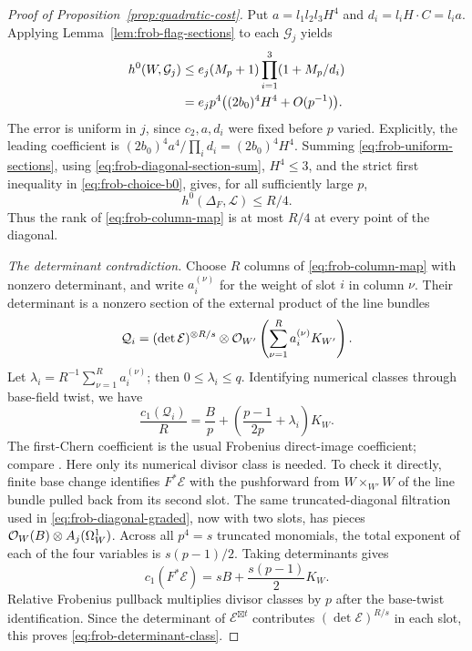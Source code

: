 \begin{proof}[Proof of Proposition~\ref{prop:quadratic-cost}]
Put $a=l_1l_2l_3H^4$ and $d_i=l_iH\cdot C=l_i a$.  Applying
Lemma~\ref{lem:frob-flag-sections} to each $\mathcal G_j$ yields
\begin{align}
 h^0(W,\mathcal G_j)
 &\le e_j(M_p+1)\prod_{i=1}^3(1+M_p/d_i)\notag\\
 &=e_jp^4\bigl((2b_0)^4H^4+O(p^{-1})\bigr).
 \label{eq:frob-uniform-sections}
\end{align}
The error is uniform in $j$, since $c_2,a,d_i$ were fixed before $p$
varied.  Explicitly, the leading coefficient is
$(2b_0)^4a^4/\prod_i d_i=(2b_0)^4H^4$.
Summing \eqref{eq:frob-uniform-sections}, using
\eqref{eq:frob-diagonal-section-sum}, $H^4\le3$, and the strict first
inequality in \eqref{eq:frob-choice-b0}, gives, for all sufficiently
large $p$,
\begin{equation}\label{eq:frob-diagonal-rank}
 h^0(\Delta_F,\mathcal L)\le R/4.
\end{equation}
Thus the rank of \eqref{eq:frob-column-map} is at most $R/4$ at every
point of the diagonal.

\emph{The determinant contradiction.}
Choose $R$ columns of \eqref{eq:frob-column-map} with nonzero
determinant, and write $a_i^{(\nu)}$ for the weight of slot $i$ in
column $\nu$.  Their determinant is a nonzero section of the external
product of the line bundles
\[
 \mathcal Q_i=(\det\mathcal E)^{\otimes R/s}
     \otimes\mathcal O_{W'}\left(\sum_{\nu=1}^R a_i^{(\nu)}K_{W'}\right).
\]
Let $\lambda_i=R^{-1}\sum_{\nu=1}^R a_i^{(\nu)}$; then
$0\le\lambda_i\le q$.
Identifying numerical classes through base-field twist, we have
\begin{equation}\label{eq:frob-determinant-class}
 \frac{c_1(\mathcal Q_i)}{R}
 =\frac{B}{p}
   +\left(\frac{p-1}{2p}+\lambda_i\right)K_W.
\end{equation}
The first-Chern coefficient is the usual Frobenius direct-image
coefficient; compare \cite[Lemma~4.2]{Sun2008}. Here only its
numerical divisor class is needed. To check it directly, finite base change identifies
$F^*\mathcal E$ with the pushforward from $W\times_{W'}W$ of the line
bundle pulled back from its second slot.  The same truncated-diagonal
filtration used in \eqref{eq:frob-diagonal-graded}, now with two slots,
has pieces $\mathcal O_W(B)\otimes A_j(\Omega_W^1)$.
Across all $p^4=s$ truncated monomials, the total exponent of each of
the four variables is $s(p-1)/2$.  Taking determinants gives
\[
 c_1(F^*\mathcal E)=sB+\frac{s(p-1)}2K_W.
\]
Relative Frobenius pullback multiplies divisor classes by $p$ after
the base-twist identification.  Since the determinant of
$\mathcal E^{\boxtimes t}$ contributes
$(\det\mathcal E)^{R/s}$ in each slot, this proves
\eqref{eq:frob-determinant-class}.


\end{proof}
